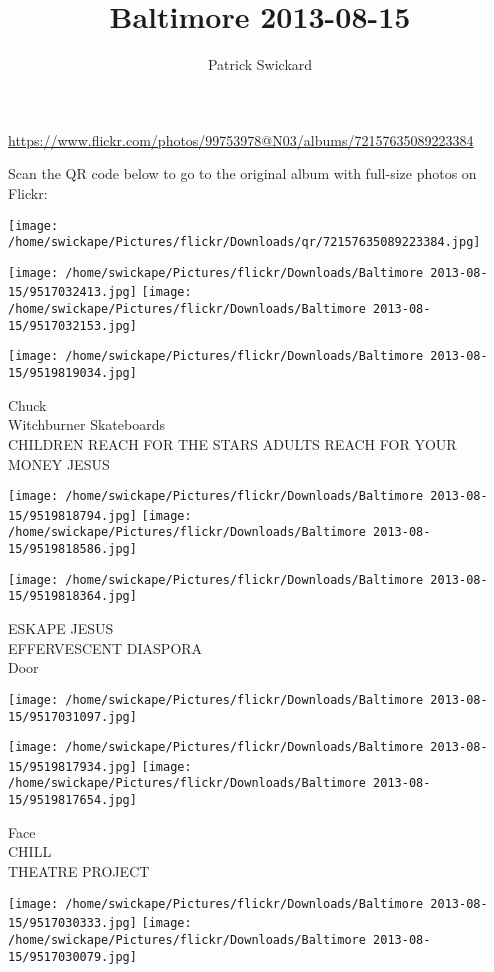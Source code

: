 \documentclass[10pt,letterpaper]{article}
\title{Baltimore 2013-08-15}
\author{Patrick Swickard}
\date{}
\begin{document}
\maketitle

\url{https://www.flickr.com/photos/99753978@N03/albums/72157635089223384}

Scan the QR code below to go to the original album with full-size photos on Flickr:

\texttt{[image: /home/swickape/Pictures/flickr/Downloads/qr/72157635089223384.jpg]}
\pagebreak

\texttt{[image: /home/swickape/Pictures/flickr/Downloads/Baltimore 2013-08-15/9517032413.jpg]}
\texttt{[image: /home/swickape/Pictures/flickr/Downloads/Baltimore 2013-08-15/9517032153.jpg]}

\vspace{0.25in}
\texttt{[image: /home/swickape/Pictures/flickr/Downloads/Baltimore 2013-08-15/9519819034.jpg]}

Chuck\\
Witchburner Skateboards\\
CHILDREN REACH FOR THE STARS ADULTS REACH FOR YOUR MONEY JESUS
\pagebreak

\texttt{[image: /home/swickape/Pictures/flickr/Downloads/Baltimore 2013-08-15/9519818794.jpg]}
\texttt{[image: /home/swickape/Pictures/flickr/Downloads/Baltimore 2013-08-15/9519818586.jpg]}

\texttt{[image: /home/swickape/Pictures/flickr/Downloads/Baltimore 2013-08-15/9519818364.jpg]}

ESKAPE JESUS\\
EFFERVESCENT DIASPORA\\
Door
\pagebreak

\texttt{[image: /home/swickape/Pictures/flickr/Downloads/Baltimore 2013-08-15/9517031097.jpg]}

\vspace{0.25in}
\texttt{[image: /home/swickape/Pictures/flickr/Downloads/Baltimore 2013-08-15/9519817934.jpg]}
\texttt{[image: /home/swickape/Pictures/flickr/Downloads/Baltimore 2013-08-15/9519817654.jpg]}

Face\\
CHILL\\
THEATRE PROJECT
\pagebreak

\texttt{[image: /home/swickape/Pictures/flickr/Downloads/Baltimore 2013-08-15/9517030333.jpg]}
\texttt{[image: /home/swickape/Pictures/flickr/Downloads/Baltimore 2013-08-15/9517030079.jpg]}
\end{document}
